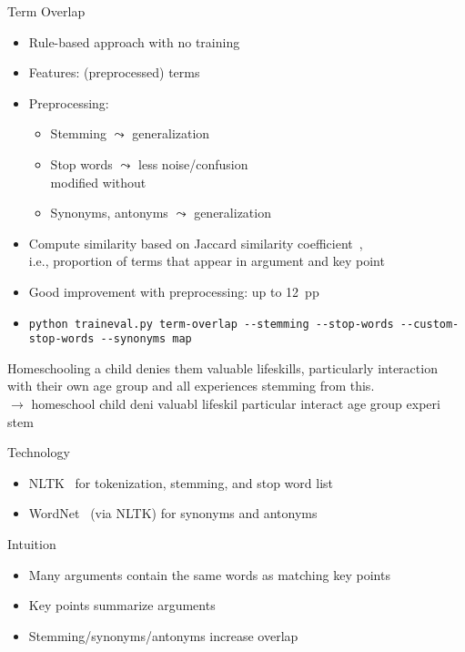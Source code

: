 \documentclass[english,handout]{mlutalk}
\begin{document}
\begin{frame}[allowframebreaks]{Term Overlap}
  
  \begin{itemize}
    \item Rule-based approach with no training
    \item Features: (preprocessed) terms
    \item Preprocessing:
    \begin{itemize}
      \item Stemming \(\leadsto\) generalization
      \item Stop words \(\leadsto\) less noise/confusion \\ modified without 
      \item Synonyms, antonyms \(\leadsto\) generalization
    \end{itemize}
    \item Compute similarity based on Jaccard similarity coefficient~\cite{Jaccard1902}, \\ i.e., proportion of terms that appear in argument and key point
    \item Good improvement with preprocessing: up to 12~pp
    \item {\tiny\lstinline{python traineval.py term-overlap --stemming --stop-words --custom-stop-words --synonyms map}}
  \end{itemize}
  
  \begin{example}[Preprocessing]
    \smaller
    Homeschooling a child denies them valuable lifeskills, particularly interaction with their own age group and all experiences stemming from this. \\
    \(\to\) homeschool child deni valuabl lifeskil particular interact age group experi stem
  \end{example}

  \framebreak
  
  \begin{block}{Technology}
      \begin{itemize}
        \item NLTK~\cite{Bird2006} for tokenization, stemming,  and stop word list
        \item WordNet~\cite{Miller1995} (via NLTK) for synonyms and antonyms
      \end{itemize}
  \end{block}

  \begin{block}{Intuition}
    \begin{itemize}
      \item Many arguments contain the same words as matching key points
      \item Key points summarize arguments
      \item Stemming/synonyms/antonyms increase overlap
    \end{itemize}


\end{block}
\end{frame}
\end{document}
